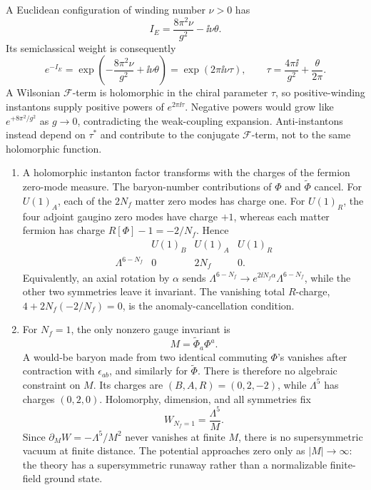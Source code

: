 \begin{enumerate}
A Euclidean configuration of winding number \(\nu>0\) has
  \[
    I_E=\frac{8\pi^2\nu}{g^2}-\ii\nu\theta.
  \]
  Its semiclassical weight is consequently
  \[
    e^{-I_E}
      =\exp\left(-\frac{8\pi^2\nu}{g^2}+\ii\nu\theta\right)
      =\exp(2\pi \ii\nu\tau),
    \qquad
    \tau=\frac{4\pi \ii}{g^2}+\frac{\theta}{2\pi}.
  \]
  A Wilsonian \(\mathcal F\)-term is holomorphic in the chiral
  parameter \(\tau\), so positive-winding instantons supply positive
  powers of \(e^{2\pi \ii\tau}\).  Negative powers would grow like
  \(e^{+8\pi^2/g^2}\) as \(g\to0\), contradicting the weak-coupling
  expansion.  Anti-instantons instead depend on \(\tau^*\) and
  contribute to the conjugate \(\mathcal F\)-term, not to the same
  holomorphic function.

  \begin{enumerate}
    \item A holomorphic instanton factor transforms with the charges of
    the fermion zero-mode measure.  The baryon-number contributions of
    \(\Phi\) and \(\widetilde\Phi\) cancel.  For \(U(1)_A\), each of the
    \(2N_f\) matter zero modes has charge one.  For \(U(1)_R\), the four
    adjoint gaugino zero modes have charge \(+1\), whereas each matter
    fermion has charge
    \(R[\Phi]-1=-2/N_f\).  Hence
    \[
      \begin{array}{c|ccc}
        &U(1)_B&U(1)_A&U(1)_R\\ \hline
        \Lambda^{6-N_f}&0&2N_f&0 .
      \end{array}
      \tag{29.6.S1}
    \]
    Equivalently, an axial rotation by \(\alpha\) sends
    \(\Lambda^{6-N_f}\to e^{2\ii N_f\alpha}\Lambda^{6-N_f}\), while the
    other two symmetries leave it invariant.  The vanishing total
    \(R\)-charge, \(4+2N_f(-2/N_f)=0\), is the anomaly-cancellation
    condition.

    \item For \(N_f=1\), the only nonzero gauge invariant is
    \[
      M=\widetilde\Phi_a\Phi^a.
    \]
    A would-be baryon made from two identical commuting \(\Phi\)'s
    vanishes after contraction with \(\epsilon_{ab}\), and similarly for
    \(\widetilde\Phi\).  There is therefore no algebraic constraint on
    \(M\).  Its charges are
    \((B,A,R)=(0,2,-2)\), while \(\Lambda^5\) has charges
    \((0,2,0)\).  Holomorphy, dimension, and all symmetries fix
    \[
      \boxed{W_{N_f=1}=\frac{\Lambda^5}{M}.}
      \tag{29.6.S2}
    \]
    Since \(\partial_MW=-\Lambda^5/M^2\) never vanishes at finite
    \(M\), there is no supersymmetric vacuum at finite distance.  The
    potential approaches zero only as \(|M|\to\infty\): the theory has a
    supersymmetric runaway rather than a normalizable finite-field ground
    state.


\end{enumerate}
\end{enumerate}
